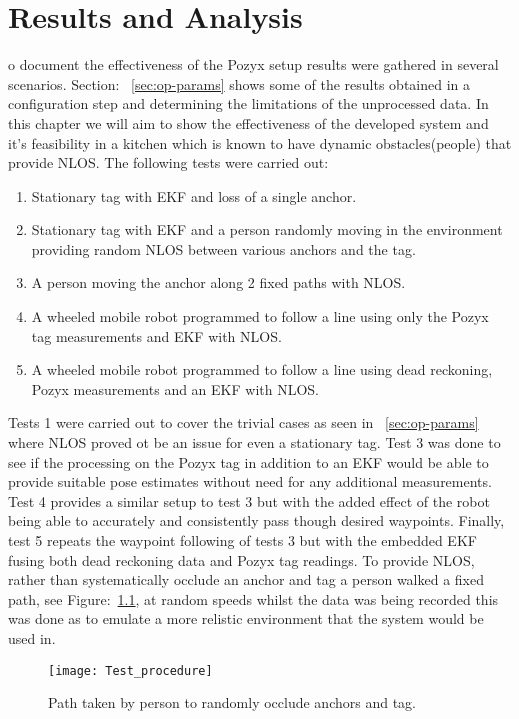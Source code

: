 \chapter{Results and Analysis}\label{ch:results-and-analysis}
o document the effectiveness of the Pozyx setup results were gathered in several scenarios.
Section: ~\ref{sec:op-params} shows some of the results obtained in a configuration step and determining the limitations of the unprocessed data.
In this chapter we will aim to show the effectiveness of the developed system and it's feasibility in a kitchen which is known to have dynamic obstacles(people) that provide NLOS.
The following tests were carried out:
\begin{enumerate}
    \item Stationary tag with EKF and loss of a single anchor.
    \item Stationary tag with EKF and a person randomly moving in the environment providing random NLOS between various anchors and the tag.
    \item A person moving the anchor along 2 fixed paths with NLOS.
    \item A wheeled mobile robot programmed to follow a line using only the Pozyx tag measurements and EKF with NLOS.
    \item A wheeled mobile robot programmed to follow a line using dead reckoning, Pozyx measurements and an EKF with NLOS.
\end{enumerate}

Tests 1 were carried out to cover the trivial cases as seen in ~\ref{sec:op-params} where NLOS proved ot be an issue for even a stationary tag.
Test 3 was done to see if the processing on the Pozyx tag in addition to an EKF would be able to provide suitable pose estimates without need for any additional measurements.
Test 4 provides a similar setup to test 3 but with the added effect of the robot being able to accurately and consistently pass though desired waypoints.
Finally, test 5 repeats the waypoint following of tests 3 but with the embedded EKF fusing both dead reckoning data and Pozyx tag readings.
To provide NLOS, rather than systematically occlude an anchor and tag a person walked a fixed path, see Figure:~\ref{fig:occlude}, at random speeds whilst the data was being recorded this was done as to emulate a more relistic environment that the system would be used in.

\begin{figure}[ht!]
    \centering
    \texttt{[image: Test\_procedure]}
    \caption{Path taken by person to randomly occlude anchors and tag.}
    \label{fig:occlude}
\end{figure}


